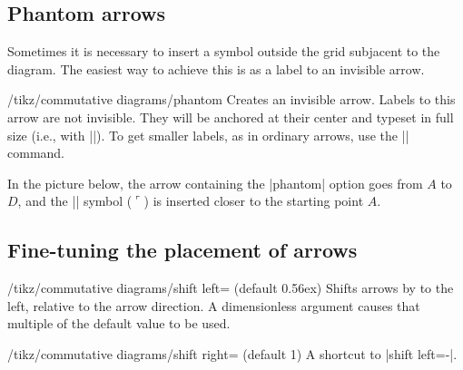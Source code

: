 \documentclass[a4paper]{ltxdoc}
\begin{document}
\begin{codeexample}[]
\end{codeexample}

\subsection{Phantom arrows}
\label{sec:phantom-arrows}

Sometimes it is necessary to insert a symbol outside the grid
subjacent to the diagram.  The easiest way to achieve this is as a
label to an invisible arrow.

\begin{stylekey}{/tikz/commutative diagrams/phantom}
  Creates an invisible arrow.  Labels to this arrow are not invisible.
  They will be anchored at their center and typeset in full size
  (i.e., with |\textstyle|).  To get smaller labels, as in ordinary
  arrows, use the |\scriptstyle| command.
\end{stylekey}

In the picture below, the arrow containing the |phantom| option goes from
$A$ to $D$, and the |\ulcorner| symbol ($\ulcorner$) is inserted
closer to the starting point $A$.
\begin{codeexample}[]
\end{codeexample}

\subsection{Fine-tuning the placement of arrows}
\label{sec:fine-tuning-arrows}

\begin{key}{/tikz/commutative diagrams/shift left=
    (default 0.56ex)}
  Shifts arrows by  to the left, relative to the arrow
  direction.  A dimensionless argument causes that multiple of the
  default value to be used.
\end{key}

\begin{key}{/tikz/commutative diagrams/shift right=
    (default 1)}
  A shortcut to |shift left=-|.
\end{key}
\end{document}
